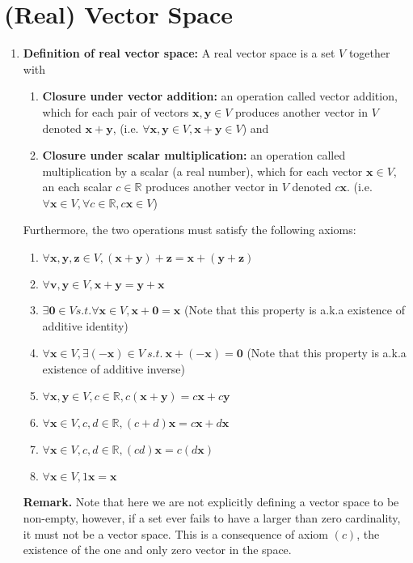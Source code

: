 \documentclass[oneside, 12pt]{book}
\newcommand{\settag}[1]{\renewcommand{\theenumi}{#1}}
\newcommand{\tbf}[1]{\textbf{#1}}
\newcommand{\vzero}{\mathbf{0}}
\begin{document}
\section{(Real) Vector Space}
\begin{enumerate}
    \settag{1.1.1}
    \item{\textbf{Definition of real vector space:}} A real vector space is a set $V$ together with
    \begin{enumerate}
        \item \textbf{Closure under vector addition:} an operation called vector addition, which for each pair of vectors $\mathbf{x}, \mathbf{y}\in V$ produces another vector in $V$ denoted $\mathbf{x} + \mathbf{y}$, (i.e. $\forall \mathbf{x}, \mathbf{y}\in V, \mathbf{x} + \mathbf{y} \in V$) and
        \item \textbf{Closure under scalar multiplication:} an operation called multiplication by a scalar (a real number), which for each vector $\mathbf{x}\in V$, an each scalar $c\in \mathbb{R}$ produces another vector in $V$ denoted $c\mathbf{x}$. (i.e. $\forall \mathbf{x}\in V, \forall c \in \mathbb{R}, c \mathbf{x} \in V$)
    \end{enumerate}
    Furthermore, the two operations must satisfy the following axioms:
    \begin{enumerate}
        \item $\forall \mathbf{x}, \mathbf{y}, \mathbf{z} \in V, (\mathbf{x} + \mathbf{y}) + \mathbf{z} = \mathbf{x} + (\mathbf{y} + \mathbf{z})$
        \item $\forall \mathbf{v}, \mathbf{y} \in V, \mathbf{x} + \mathbf{y} = \mathbf{y} + \mathbf{x}$
        \item $\exists \vzero \in V s.t. \forall \mathbf{x} \in V, \mathbf{x} + \vzero = \mathbf{x}$ (Note that this property is a.k.a existence of additive identity)
        \item $\forall \mathbf{x} \in V, \exists (-\mathbf{x}) \in V~s.t.~\mathbf{x} + (-\mathbf{x}) = \vzero$ (Note that this property is a.k.a existence of additive inverse)
        \item $\forall \mathbf{x}, \mathbf{y} \in V, c \in \mathbb{R}, c(\mathbf{x} + \mathbf{y}) = c\mathbf{x} + c\mathbf{y}$
        \item $\forall \mathbf{x} \in V, c,d \in \mathbb{R}, (c + d)\mathbf{x} = c\mathbf{x} + d\mathbf{x}$
        \item $\forall \mathbf{x} \in V, c,d \in \mathbb{R}, (cd)\mathbf{x} = c(d\mathbf{x})$
        \item $\forall \mathbf{x} \in V, 1\mathbf{x} = \mathbf{x}$
    \end{enumerate}
    \tbf{Remark.} Note that here we are not explicitly defining a vector space to be non-empty, however, if a set ever fails to have a larger than zero cardinality, it must not be a vector space. This is a consequence of axiom $(c)$, the existence of the one and only zero vector in the space.
    

\end{enumerate}
\end{document}
